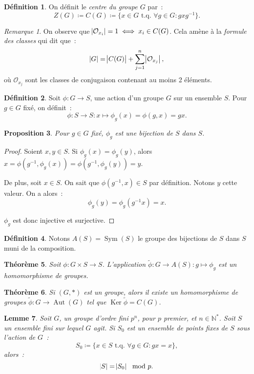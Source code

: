 \documentclass{article}
\newtheorem{thm}{Théorème}[section]
\newtheorem{prp}[thm]{Proposition}
\newtheorem{lem}[thm]{Lemme}
\theoremstyle{definition}
\newtheorem{déf}[thm]{Définition}
\theoremstyle{remark}
\newtheorem*{rmq}{Remarque}
\DeclareMathOperator{\Ker}{Ker}
\DeclareMathOperator{\Aut}{Aut}
\DeclareMathOperator{\Sym}{Sym}
\newcommand{\N}{\mathbb N}
\newcommand{\tq}{\text{ t.q. }}
\begin{document}
	\begin{déf} On définit le \textit{centre du groupe $G$} par~:
	\[Z(G) \coloneqq C(G) \coloneqq \{x \in G \tq \forall g \in G : gxg^{-1}\}.\]
	\end{déf}

	\begin{rmq} On observe que $\abs {\mathcal O_{x_i}} = 1 \iff x_i \in C(G)$. Cela amène à la \textit{formule des classes} qui dit que~:
	\[\abs G = \abs {C(G)} + \sum_{j=1}^n\abs {\mathcal O_{x_j}},\]
	où $\mathcal O_{x_j}$ sont les classes de conjugaison contenant au moins 2 éléments.
	\end{rmq}

	\begin{déf} Soit $\phi : G \to S$, une action d'un groupe $G$ sur un ensemble $S$. Pour $g \in G$ fixé, on définit~:
	\[\phi : S \to S : x \mapsto \phi_g(x) = \phi(g, x) = gx.\]
	\end{déf}

	\begin{prp} Pour $g \in G$ fixé, $\phi_g$ est une bijection de $S$ dans $S$.
	\end{prp}

	\begin{proof} Soient $x, y \in S$. Si $\phi_g(x) = \phi_g(y)$, alors $x = \phi(g^{-1}, \phi_g(x)) = \phi(g^{-1}, \phi_g(y)) = y$.

	De plus, soit $x \in S$. On sait que $\phi(g^{-1}, x) \in S$ par définition. Notons $y$ cette valeur. On a alors~:
	\[\phi_g(y) = \phi_g(g^{-1}x) = x.\]

	$\phi_g$ est donc injective et surjective.
	\end{proof}

	\begin{déf} Notons $A(S) = \Sym(S)$ le groupe des bijections de $S$ dans $S$ muni de la composition.
	\end{déf}

	\begin{thm} Soit $\phi : G \times S \to S$. L'application $\widetilde \phi : G \to A(S) : g \mapsto \phi_g$ est un homomorphisme de groupes.
	\end{thm}

	\begin{thm} Si $(G, *)$ est un groupe, alors il existe un homomorphisme de groupes $\widetilde \phi : G \to \Aut(G)$ tel que $\Ker \widetilde \phi = C(G)$.
	\end{thm}

	\begin{lem} Soit $G$, un groupe d'ordre fini $p^n$, pour $p$ premier, et $n \in \N^*$. Soit $S$ un ensemble fini sur lequel $G$ agit. Si $S_0$ est un
	ensemble de points fixes de $S$ sous l'action de $G$~:
	\[S_0 \coloneqq \{x \in S \tq \forall g \in G : gx = x\},\]
	alors~:
	\[\abs S = \abs {S_0} \mod p.\]
	\end{lem}
\end{document}

